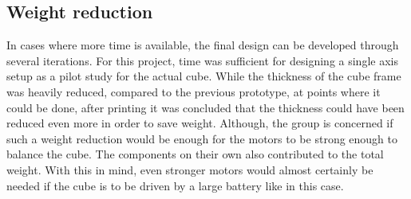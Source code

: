 \subsection{Weight reduction}
In cases where more time is available, the final design can be developed through several iterations. For this project, time was sufficient for designing a single axis setup as a pilot study for the actual cube. While the thickness of the cube frame was heavily reduced, compared to the previous prototype, at points where it could be done, after printing it was concluded that the thickness could have been reduced even more in order to save weight. Although, the group is concerned if such a weight reduction would be enough for the motors to be strong enough to balance the cube. The components on their own also contributed to the total weight. With this in mind, even stronger motors would almost certainly be needed if the cube is to be driven by a large battery like in this case.